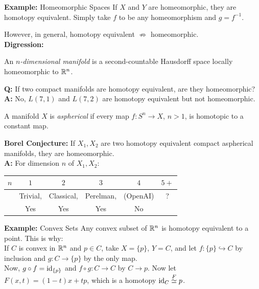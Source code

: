 
\begin{example}{\textbf{Example:} Homeomorphic Spaces}
    If $X$ and $Y$ are homeomorphic, they are homotopy equivalent. Simply take $f$ to be any homeomorphism and $g = f^{-1}$.
\end{example}

However, in general, homotopy equivalent $\not\Rightarrow$ homeomorphic.\\

\textbf{Digression:}

\begin{definition}
    An \emph{$n$-dimensional manifold} is a second-countable Hausdorff space locally homeomorphic to $\mathbb{R}^n$.
\end{definition}

\textbf{Q:} If two compact manifolds are homotopy equivalent, are they homeomorphic?\\
\textbf{A:} No, $L(7, 1)$ and $L(7, 2)$ are homotopy equivalent but not homeomorphic.

\begin{definition}
    A manifold $X$ is \emph{aspherical} if every map $f : S^n \to X$, $n > 1$, is homotopic to a constant map.
\end{definition}

\textbf{Borel Conjecture:} If $X_1, X_2$ are two homotopy equivalent compact aspherical manifolds, they are homeomorphic.\\

\textbf{A:} For dimension $n$ of $X_1, X_2$:
\begin{center}
    \begin{tabular}{c|ccccc}
        $n$ & $1$ & $2$ & $3$ & $4$ & $5+$ \\
        \hline
        & Trivial, & Classical, & Perelman, & (OpenAI) & ? \\
        & Yes & Yes & Yes & No &
    \end{tabular}
\end{center}

\begin{example}{\textbf{Example:} Convex Sets}
    Any convex subset of $\mathbb{R}^n$ is homotopy equivalent to a point. This is why:\\

    If $C$ is convex in $\mathbb{R}^n$ and $p \in C$, take $X = \{p\}$, $Y = C$, and let $f : \{p\} \hookrightarrow C$ by inclusion and $g : C \to \{p\}$ by the only map.\\


    Now, $g \circ f = \text{id}_{\{p\}}$ and $f \circ g : C \to C$ by $C \to p$. Now let $F(x, t) = (1 - t)x + tp$, which is a homotopy $\text{id}_C \overset{F}{\simeq} p$.
\end{example}


